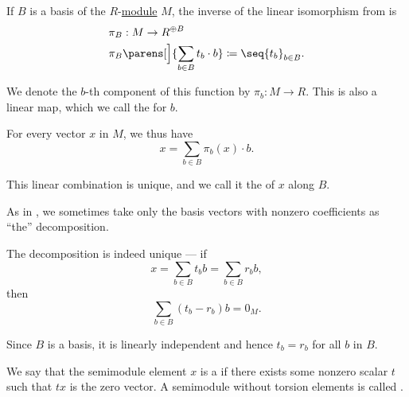 \begin{definition}\label{def:basis_decomposition}\mimprovised
  If \( B \) is a basis of the \( R \)-\hyperref[def:module]{module} \( M \), the inverse of the linear isomorphism from  is
  \begin{equation*}
    \begin{aligned}
      &\pi_B: M \to R^{\oplus B} \\
      &\pi_B\parens[\Big]{ \sum_{b \in B} t_b \cdot b } \coloneqq \seq{ t_b }_{b \in B}.
    \end{aligned}
  \end{equation*}

  We denote the \( b \)-th component of this function by \( \pi_b: M \to R \). This is also a linear map, which we call the  for \( b \).

  For every vector \( x \) in \( M \), we thus have
  \begin{equation*}
    x = \sum_{b \in B} \pi_b(x) \cdot b.
  \end{equation*}

  This linear combination is unique, and we call it the  of \( x \) along \( B \).

  As in , we sometimes take only the basis vectors with nonzero coefficients as \enquote{the} decomposition.
\end{definition}
\begin{defproof}
  The decomposition is indeed unique --- if
  \begin{equation*}
    x = \sum_{b \in B} t_b b = \sum_{b \in B} r_b b,
  \end{equation*}
  then
  \begin{equation*}
    \sum_{b \in B} (t_b - r_b) b = 0_M.
  \end{equation*}

  Since \( B \) is a basis, it is linearly independent and hence \( t_b = r_b \) for all \( b \) in \( B \).
\end{defproof}

\begin{definition}\label{def:semimodule_torsion}\mimprovised
  We say that the semimodule element \( x \) is a  if there exists some nonzero scalar \( t \) such that \( tx \) is the zero vector. A semimodule without torsion elements is called .
\end{definition}

